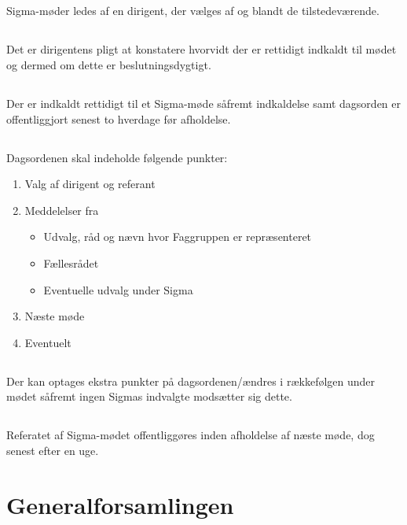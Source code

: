 \documentclass[danish,a4paper,twocolumn]{article}
\begin{document}
\subsection{}Sigma-møder ledes af en dirigent, der vælges af og blandt de tilstedeværende.
\subsection{}Det er dirigentens pligt at konstatere hvorvidt der er rettidigt indkaldt til mødet og dermed om dette er beslutningsdygtigt.
\subsection{}Der er indkaldt rettidigt til et Sigma-møde såfremt indkaldelse samt dagsorden er offentliggjort senest to hverdage før afholdelse.
\subsection{}Dagsordenen skal indeholde følgende punkter:
\begin{enumerate}
        \item Valg af dirigent og referant
        \item Meddelelser fra
        \begin{itemize}
                \item Udvalg, råd og nævn hvor Faggruppen er repræsenteret
                \item Fællesrådet
                \item Eventuelle udvalg under Sigma
        \end{itemize}
        \item Næste møde
        \item Eventuelt
\end{enumerate}
\subsection{}Der kan optages ekstra punkter på dagsordenen/ændres i rækkefølgen under mødet såfremt ingen Sigmas indvalgte modsætter sig dette.
\subsection{}Referatet af Sigma-mødet offentliggøres inden afholdelse af næste møde, dog senest efter en uge.
 
\section{Generalforsamlingen}
\end{document}
